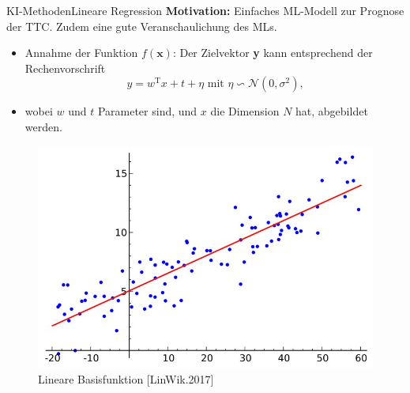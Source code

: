 \documentclass[169, handout	]{THIbeamer} %
\begin{document}
	\begin{frame}{KI-Methoden}{Lineare Regression}
		\footnotesize		
		\textbf{Motivation:} Einfaches ML-Modell zur Prognose der TTC. Zudem eine gute Veranschaulichung des MLs.
		\begin{itemize}
			\item Annahme der Funktion $f(\textbf{x})$: Der Zielvektor \textbf{y} kann entsprechend der Rechenvorschrift
			\begin{equation}
				y = w^{\text{T}} x + t + \eta \text{ mit } \eta \backsim \mathcal{N}(0, \sigma^2) \text{,}
			\end{equation}
			\item[] wobei $w$ und $t$ Parameter sind, und $x$ die Dimension $N$ hat, abgebildet werden.		   
		\end{itemize}
		\begin{figure}
			\includegraphics[scale=0.25]{required/Lineare_Regression.jpg}
			\caption{\scriptsize Lineare Basisfunktion [LinWik.2017]}
        	\label{Over and Underfitting}
		\end{figure}
	\end{frame}
\end{document}
